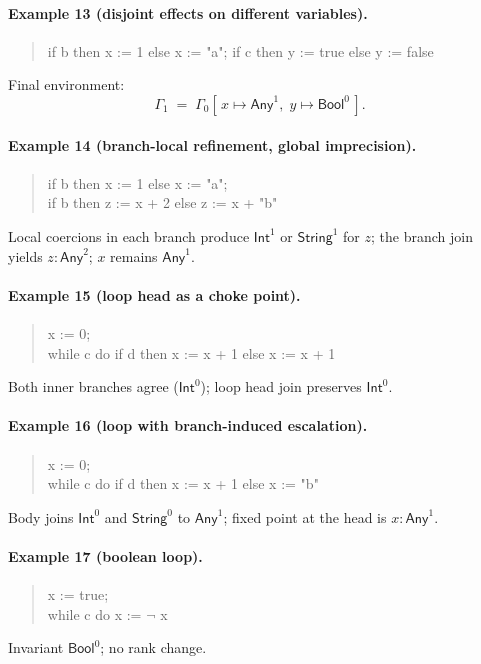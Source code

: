 \paragraph{Example 13 (disjoint effects on different variables).}
\begin{quote}\ttfamily
if b then x := 1 else x := "a";\quad
if c then y := true else y := false
\end{quote}
Final environment:
\[
\Gamma_1 \;=\; \Gamma_0[\,x \mapsto \textsf{Any}^{1},\; y \mapsto \textsf{Bool}^{0}\,].
\]

\paragraph{Example 14 (branch-local refinement, global imprecision).}
\begin{quote}\ttfamily
if b then x := 1 else x := "a";\\
if b then z := x + 2 else z := x + "b"
\end{quote}
Local coercions in each branch produce $\textsf{Int}^{1}$ or $\textsf{String}^{1}$ for $z$; the branch join yields $z:\textsf{Any}^{2}$; $x$ remains $\textsf{Any}^{1}$.

\paragraph{Example 15 (loop head as a choke point).}
\begin{quote}\ttfamily
x := 0;\\
while c do if d then x := x + 1 else x := x + 1
\end{quote}
Both inner branches agree ($\textsf{Int}^{0}$); loop head join preserves $\textsf{Int}^{0}$.

\paragraph{Example 16 (loop with branch-induced escalation).}
\begin{quote}\ttfamily
x := 0;\\
while c do if d then x := x + 1 else x := "b"
\end{quote}
Body joins $\textsf{Int}^{0}$ and $\textsf{String}^{0}$ to $\textsf{Any}^{1}$; fixed point at the head is $x:\textsf{Any}^{1}$.

\paragraph{Example 17 (boolean loop).}
\begin{quote}\ttfamily
x := true;\\
while c do x := $\neg$ x
\end{quote}
Invariant $\textsf{Bool}^{0}$; no rank change.

